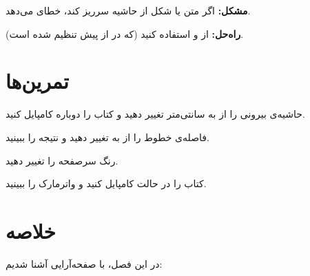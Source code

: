 \textbf{مشکل:} اگر متن یا شکل از حاشیه سرریز
کند، خطای  می‌دهد.

\textbf{راه‌حل:} از  و
 استفاده کنید (که در
 از پیش تنظیم شده است).

\section{تمرین‌ها}
\label{sec:layout-exercises}

\begin{exercise}
    حاشیه‌ی بیرونی را از  به
     سانتی‌متر تغییر دهید و کتاب
    را دوباره کامپایل کنید.
    \label{exc:layout-margins}
\end{exercise}

\begin{exercise}
    فاصله‌ی خطوط را از  به
     تغییر دهید و نتیجه را ببینید.
    \label{exc:layout-spacing}
\end{exercise}

\begin{exercise}
    رنگ سرصفحه را تغییر دهید.
    \label{exc:layout-headers}
\end{exercise}

\begin{exercise}
    کتاب را در حالت  کامپایل کنید
    و واترمارک را ببینید.
    \label{exc:layout-draft}
\end{exercise}

\section{خلاصه}
\label{sec:layout-summary}

در این فصل، با صفحه‌آرایی 
آشنا شدیم:

